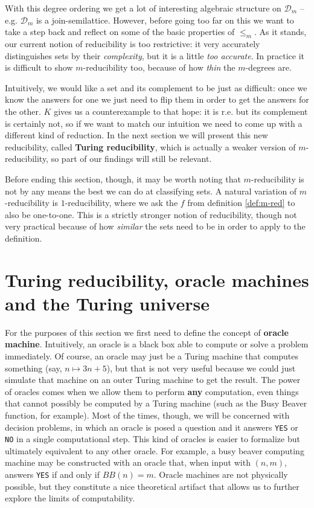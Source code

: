 \documentclass[../main.tex]{memoir}
\begin{document}
With this degree ordering we get a lot of interesting algebraic structure on $\mathbf{\mathcal{D}}_m$ -- e.g. $\mathbf{\mathcal{D}}_m$ is a join-semilattice. However, before going too far on this we want to take a step back and reflect on some of the basic properties of $\le_m$. As it stands, our current notion of reducibility is too restrictive: it very accurately distinguishes sets by their \textit{complexity}, but it is a little \textit{too accurate}. In practice it is difficult to show $m$-reducibility too, because of how \textit{thin} the $m$-degrees are.

Intuitively, we would like a set and its complement to be just as difficult: once we know the answers for one we just need to flip them in order to get the answers for the other. $K$ gives us a counterexample to that hope: it is r.e. but its complement is certainly not, so if we want to match our intuition we need to come up with a different kind of reduction. In the next section we will present this new reducibility, called \textbf{Turing reducibility}, which is actually a weaker version of $m$-reducibility, so part of our findings will still be relevant.

Before ending this section, though, it may be worth noting that $m$-reducibility is not by any means the best we can do at classifying sets. A natural variation of $m$-reducibility is $1$-reducibility, where we ask the $f$ from definition \ref{def:m-red} to also be one-to-one. This is a strictly stronger notion of reducibility, though not very practical because of how \textit{similar} the sets need to be in order to apply to the definition.

\section{Turing reducibility, oracle machines and the Turing universe}

For the purposes of this section we first need to define the concept of \textbf{oracle machine}. Intuitively, an oracle is a black box able to compute or solve a problem immediately. Of course, an oracle may just be a Turing machine that computes something (say, $n \mapsto 3n + 5$), but that is not very useful because we could just simulate that machine on an outer Turing machine to get the result. The power of oracles comes when we allow them to perform \textbf{any} computation, even things that cannot possibly be computed by a Turing machine (such as the Busy Beaver function, for example). Most of the times, though, we will be concerned with decision problems, in which an oracle is posed a question and it answers \texttt{YES} or \texttt{NO} in a single computational step. This kind of oracles is easier to formalize but ultimately equivalent to any other oracle. For example, a busy beaver computing machine may be constructed with an oracle that, when input with $(n, m)$, answers \texttt{YES} if and only if $BB(n) = m$. Oracle machines are not physically possible, but they constitute a nice theoretical artifact that allows us to further explore the limits of computability.
\end{document}
